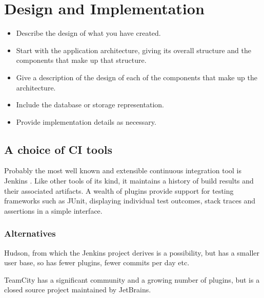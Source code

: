 \section{Design and Implementation}
\label{sec:imp}

\begin{framed}
	\begin{itemize}
		\item Describe the design of what you have created.
		\item Start with the application architecture, giving its overall structure and the components that make up that structure.
		\item Give a description of the design of each of the components that make up the architecture.
		\item Include the database or storage representation.
		\item Provide implementation details as necessary.
	\end{itemize}
\end{framed}


\subsection{A choice of CI tools}

Probably the most well known and extensible continuous integration tool is Jenkins \cite{Jenkins}. Like other tools of its kind, it maintains a history of build results and their associated artifacts. A wealth of plugins provide support for testing frameworks such as JUnit, displaying individual test outcomes, stack traces and assertions in a simple interface.

\subsubsection{Alternatives}

Hudson, from which the Jenkins project derives is a possibility, but has a smaller user base, so has fewer plugins, fewer commits per day etc.

TeamCity \cite{TeamCity} has a significant community and a growing number of plugins, but is a closed source project maintained by JetBrains.

